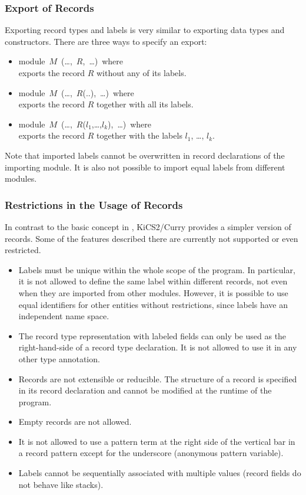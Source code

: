 \documentclass[11pt,fleqn]{article}
\renewcommand{\tt}{\usefont{OT1}{cmtt}{m}{n}\selectfont}
\newcommand{\codefont}{\tt}
\newcommand{\code}[1]{\mbox{\codefont #1}}
\begin{document}
\subsubsection{Export of Records}
\label{sec-exprecs}

Exporting record types and labels is very similar to exporting
data types and constructors. There are three ways 
to specify an export:
\begin{itemize}
\item \code{module $M$ (\ldots, $R$, \ldots) where} \\
  exports the record $R$ without any of its labels.
\item \code{module $M$ (\ldots, $R$(..), \ldots) where} \\
  exports the record $R$ together with all its labels.
\item \code{module $M$ (\ldots, $R$($l_1$,\ldots,$l_k$), \ldots) where} \\
  exports the record $R$ together with the labels $l_1$, \ldots, $l_k$.
\end{itemize}
%
Note that imported labels cannot be overwritten in record declarations
of the importing module. It is also not possible to import equal labels
from different modules.


\subsubsection{Restrictions in the Usage of Records}
\label{sec-restrinrecs}

In contrast to the basic concept in \cite{Leijen05}, KiCS2/Curry provides a
simpler version of records. Some of the features described there are
currently not supported or even restricted.

\begin{itemize}
\item Labels must be unique within the whole scope of the program.
  In particular, it is not allowed to define the same label within
  different records, not even when they are imported from other
  modules. However, it is possible to use equal identifiers for other
  entities without restrictions, since labels have an independent 
  name space.
\item The record type representation with labeled fields can only be
  used as the right-hand-side of a record type declaration. It is
  not allowed to use it in any other type annotation.
\item Records are not extensible or reducible. The structure of a
  record is specified in its record declaration and cannot be
  modified at the runtime of the program.
\item Empty records are not allowed.
\item It is not allowed  to use a pattern term
  at the right side of the vertical bar in a record pattern
  except for the underscore (anonymous pattern variable).
\item Labels cannot be sequentially associated with multiple values
  (record fields do not behave like stacks).
\end{itemize}
\end{document}
